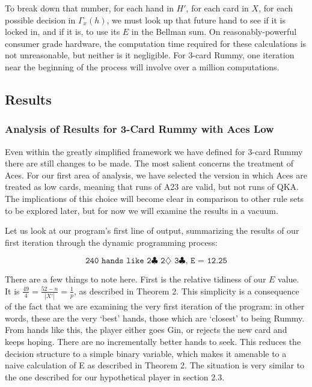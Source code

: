 \documentclass[letter,12pt]{article}
\begin{document}
To break down that number, for each hand in $H'$, for each card in $X$, for each possible decision in $\Gamma_x(h)$, we must look up that future hand to see if it is locked in, and if it is, to use its $E$ in the Bellman sum. On reasonably-powerful consumer grade hardware, the computation time required for these calculations is not unreasonable, but neither is it negligible. For 3-card Rummy, one iteration near the beginning of the process will involve over a million computations.

\subsection{Results}

\subsubsection{Analysis of Results for 3-Card Rummy with Aces Low}

Even within the greatly simplified framework we have defined for 3-card Rummy there are still changes to be made. The most salient concerns the treatment of Aces. For our first area of analysis, we have selected the version in which Aces are treated as low cards, meaning that runs of A23 are valid, but not runs of QKA. The implications of this choice will become clear in comparison to other rule sets to be explored later, but for now we will examine the results in a vacuum.

Let us look at our program’s first line of output, summarizing the results of our first iteration through the dynamic programming process: 

$$\texttt{240 hands like 2$\clubsuit$ 2$\diamondsuit$ 3$\clubsuit$, E = 12.25}$$ 

There are a few things to note here. First is the relative tidiness of our $E$ value. It is $\frac{49}{4} = \frac{52-n}{|X'|} = \frac{1}{p}$, as described in Theorem 2. This simplicity is a consequence of the fact that we are examining the very first iteration of the program: in other words, these are the very ‘best’ hands, those which are ‘closest’ to being Rummy. From hands like this, the player either goes Gin, or rejects the new card and keeps hoping. There are no incrementally better hands to seek. This reduces the decision structure to a simple binary variable, which makes it amenable to a naive calculation of E as described in Theorem 2. The situation is very similar to the one described for our hypothetical player in section 2.3. 
\end{document}

